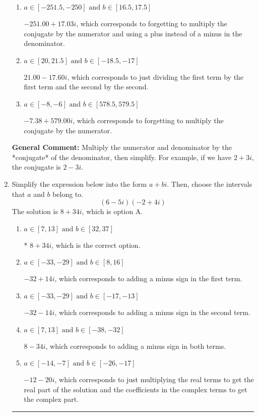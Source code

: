 \documentclass{extbook}[14pt]
\newcommand{\litem}[1]{\item #1

\rule{\textwidth}{0.4pt}}
\begin{document}
\begin{enumerate}
{\begin{enumerate}[label=\Alph*.]
 $18.50  - 1.50 i$, which corresponds to forgetting to multiply the conjugate by the numerator and not computing the conjugate correctly.
\item \( a \in [-251.5, -250] \text{ and } b \in [16.5, 17.5] \)

 $-251.00  + 17.03 i$, which corresponds to forgetting to multiply the conjugate by the numerator and using a plus instead of a minus in the denominator.
\item \( a \in [20, 21.5] \text{ and } b \in [-18.5, -17] \)

 $21.00  - 17.60 i$, which corresponds to just dividing the first term by the first term and the second by the second.
\item \( a \in [-8, -6] \text{ and } b \in [578.5, 579.5] \)

 $-7.38  + 579.00 i$, which corresponds to forgetting to multiply the conjugate by the numerator.
\end{enumerate}

\textbf{General Comment:} Multiply the numerator and denominator by the *conjugate* of the denominator, then simplify. For example, if we have $2+3i$, the conjugate is $2-3i$.
}
\litem{
Simplify the expression below into the form $a+bi$. Then, choose the intervals that $a$ and $b$ belong to.
\[ (6 - 5 i)(-2 + 4 i) \]
The solution is \( 8 + 34 i \), which is option A.\begin{enumerate}[label=\Alph*.]
\item \( a \in [7, 13] \text{ and } b \in [32, 37] \)

* $8 + 34 i$, which is the correct option.
\item \( a \in [-33, -29] \text{ and } b \in [8, 16] \)

 $-32 + 14 i$, which corresponds to adding a minus sign in the first term.
\item \( a \in [-33, -29] \text{ and } b \in [-17, -13] \)

 $-32 - 14 i$, which corresponds to adding a minus sign in the second term.
\item \( a \in [7, 13] \text{ and } b \in [-38, -32] \)

 $8 - 34 i$, which corresponds to adding a minus sign in both terms.
\item \( a \in [-14, -7] \text{ and } b \in [-26, -17] \)

 $-12 - 20 i$, which corresponds to just multiplying the real terms to get the real part of the solution and the coefficients in the complex terms to get the complex part.
\end{enumerate}

}
\end{enumerate}
\end{document}
